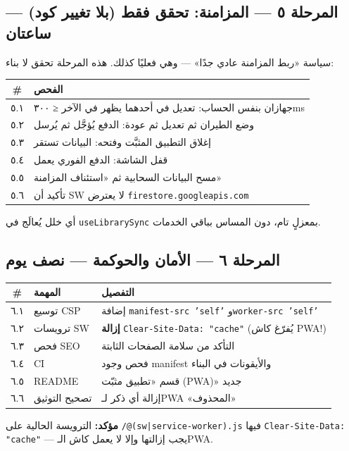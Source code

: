 \documentclass[11pt]{article}
\newcommand{\code}[1]{\textcolor{darkbg}{\texttt{\small #1}}}
\begin{document}
\subsection{المرحلة ٥ — المزامنة: تحقق فقط (بلا تغيير كود) — ساعتان}
سياسة «ربط المزامنة عادي جدًا» — وهي فعليًا كذلك. هذه المرحلة تحقق لا بناء:
\begin{tabular}{@{}c p{10cm}@{}}
\toprule
\textbf{\#} & \textbf{الفحص} \\
\midrule
٥.١ & جهازان بنفس الحساب: تعديل في أحدهما يظهر في الآخر ≤ ٣٠٠ms \\
٥.٢ & وضع الطيران ثم تعديل ثم عودة: الدفع يُؤجَّل ثم يُرسل \\
٥.٣ & إغلاق التطبيق المثبَّت وفتحه: البيانات تستقر \\
٥.٤ & قفل الشاشة: الدفع الفوري يعمل \\
٥.٥ & مسح البيانات السحابية ثم «استئناف المزامنة» \\
٥.٦ & تأكيد أن SW لا يعترض \code{firestore.googleapis.com} \\
\bottomrule
\end{tabular}
\begin{infobox}
أي خلل يُعالَج في \code{useLibrarySync} بمعزلٍ تام، دون المساس بباقي الخدمات.
\end{infobox}

\subsection{المرحلة ٦ — الأمان والحوكمة — نصف يوم}
\begin{tabular}{@{}c p{6.5cm} p{5cm}@{}}
\toprule
\textbf{\#} & \textbf{المهمة} & \textbf{التفصيل} \\
\midrule
٦.١ & توسيع CSP & إضافة \code{manifest-src 'self'} و\code{worker-src 'self'} \\
٦.٢ & ترويسات SW & \textbf{إزالة} \code{Clear-Site-Data: "cache"} (يُفرّغ كاش PWA!) \\
٦.٣ & فحص SEO & التأكد من سلامة الصفحات الثابتة \\
٦.٤ & CI & فحص وجود manifest والأيقونات في البناء \\
٦.٥ & README & قسم «تطبيق مثبّت (PWA)» جديد \\
٦.٦ & تصحيح التوثيق & إزالة أي ذكر لـPWA «المحذوف» \\
\bottomrule
\end{tabular}
\begin{riskbox}
\textbf{مؤكد:} الترويسة الحالية على \code{/@(sw|service-worker).js} فيها \code{Clear-Site-Data: "cache"} — يجب إزالتها وإلا لا يعمل كاش الـPWA.
\end{riskbox}
\end{document}
